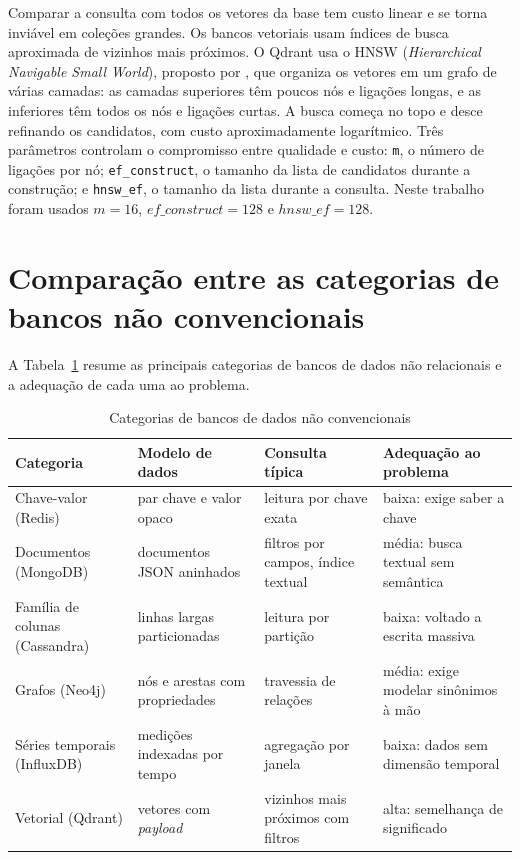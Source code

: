 \documentclass[12pt,oneside,a4paper,english,brazil]{abntex2}
\newcommand{\campo}[1]{\texttt{#1}}
\begin{document}
Comparar a consulta com todos os vetores da base tem custo linear e se torna inviável em coleções grandes. Os bancos vetoriais usam índices de busca aproximada de vizinhos mais próximos. O Qdrant usa o HNSW (\emph{Hierarchical Navigable Small World}), proposto por , que organiza os vetores em um grafo de várias camadas: as camadas superiores têm poucos nós e ligações longas, e as inferiores têm todos os nós e ligações curtas. A busca começa no topo e desce refinando os candidatos, com custo aproximadamente logarítmico. Três parâmetros controlam o compromisso entre qualidade e custo: \campo{m}, o número de ligações por nó; \campo{ef\_construct}, o tamanho da lista de candidatos durante a construção; e \campo{hnsw\_ef}, o tamanho da lista durante a consulta. Neste trabalho foram usados $m = 16$, $ef\_construct = 128$ e $hnsw\_ef = 128$.

\section{Comparação entre as categorias de bancos não convencionais}

A Tabela~\ref{tab:categorias} resume as principais categorias de bancos de dados não relacionais e a adequação de cada uma ao problema.

\begin{table}[htb]
  \centering
  \caption{Categorias de bancos de dados não convencionais}
  \label{tab:categorias}
  \footnotesize
  \begin{tabular}{|p{2.3cm}|p{3.6cm}|p{3.6cm}|p{4.3cm}|}
    \hline
    \textbf{Categoria} & \textbf{Modelo de dados} & \textbf{Consulta típica} & \textbf{Adequação ao problema} \\ \hline
    Chave-valor (Redis) & par chave e valor opaco & leitura por chave exata & baixa: exige saber a chave \\ \hline
    Documentos (MongoDB) & documentos JSON aninhados & filtros por campos, índice textual & média: busca textual sem semântica \\ \hline
    Família de colunas (Cassandra) & linhas largas particionadas & leitura por partição & baixa: voltado a escrita massiva \\ \hline
    Grafos (Neo4j) & nós e arestas com propriedades & travessia de relações & média: exige modelar sinônimos à mão \\ \hline
    Séries temporais (InfluxDB) & medições indexadas por tempo & agregação por janela & baixa: dados sem dimensão temporal \\ \hline
    Vetorial (Qdrant) & vetores com \emph{payload} & vizinhos mais próximos com filtros & alta: semelhança de significado \\ \hline
  \end{tabular}
\end{table}
\end{document}
